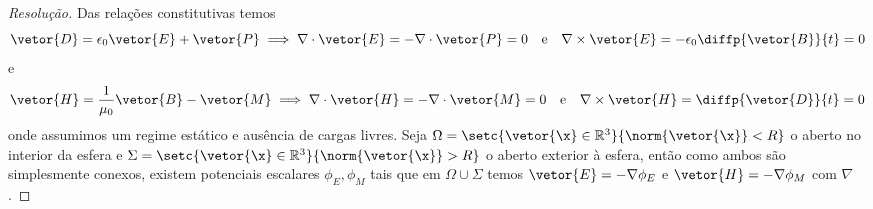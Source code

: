\begin{proof}[Resolução]
    Das relações constitutivas temos
    \begin{equation*}
        \vetor{D} = \epsilon_0 \vetor{E} + \vetor{P} \implies \nabla\cdot \vetor{E} = -\nabla\cdot \vetor{P} = 0 \quad\text{e}\quad \nabla \times \vetor{E} = - \epsilon_0 \diffp{\vetor{B}}{t} = 0
    \end{equation*}
    e
    \begin{equation*}
        \vetor{H} = \frac1{\mu_0}\vetor{B} - \vetor{M} \implies \nabla\cdot \vetor{H} = -\nabla\cdot \vetor{M} = 0 \quad\text{e}\quad \nabla \times \vetor{H} = \diffp{\vetor{D}}{t} = 0
    \end{equation*}
    onde assumimos um regime estático e ausência de cargas livres. Seja \(\Omega = \setc{\vetor{\x} \in \mathbb{R}^3}{\norm{\vetor{\x}}< R}\) o aberto no interior da esfera e \(\Sigma = \setc{\vetor{\x} \in \mathbb{R}^3}{\norm{\vetor{\x}}> R}\) o aberto exterior à esfera, então como ambos são simplesmente conexos, existem potenciais escalares \(\phi_E, \phi_M\) tais que em \(\Omega\cup \Sigma\) temos \(\vetor{E} = - \nabla \phi_E\) e \(\vetor{H} = - \nabla \phi_M\) com \(\nabla\).


\end{proof}
